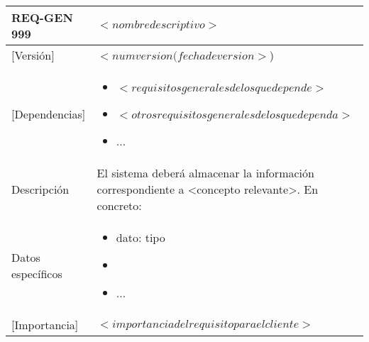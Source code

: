 \begin{Artefacto}[H]
    \centering
    \begin{tabular}{|p{3cm}|p{10cm}|}
        \hline
         \cellcolor{gray30}  REQ-GEN 999	&  $<nombre descriptivo>$\\ 
        \hline
         \cellcolor{gray30}  [Versión]	&  $<num version(fecha de version>$)\\   
         \hline
         \cellcolor{gray30}  [Dependencias] &  	\begin{itemize} 	\item $<requisitos generales de los que depende>$
\item $<otros requisitos generales de los que dependa>$
\item	... \end{itemize}\\  
        \hline
         \cellcolor{gray30} Descripción	&El sistema deberá almacenar la información correspondiente a <concepto relevante>. En concreto:\\
          \hline
         \cellcolor{gray30}  Datos específicos&  	\begin{itemize} 	\item dato: tipo
                                                                                           \item 
																	\item	... \end{itemize}\\  
        \hline          
           \cellcolor{gray30}[Importancia]	& $<importancia del requisito para el cliente>$  \\

\end{tabular}
\end{Artefacto}

